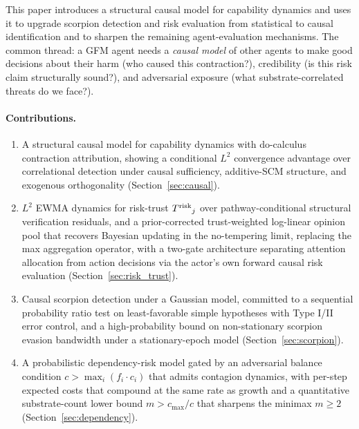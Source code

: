 This paper introduces a structural causal model for capability dynamics
and uses it to upgrade scorpion detection and risk evaluation from
statistical to causal identification and to sharpen the remaining
agent-evaluation mechanisms. The common
thread: a GFM agent needs a \emph{causal model} of other agents to make
good decisions about their harm (who caused this contraction?),
credibility (is this risk claim structurally sound?), and adversarial
exposure (what substrate-correlated threats do we face?).

\paragraph{Contributions.}
\begin{enumerate}
\item A structural causal model for capability dynamics with
  do-calculus contraction attribution, showing a conditional $L^2$
  convergence advantage over correlational detection under causal
  sufficiency, additive-SCM structure, and exogenous orthogonality
  (Section~\ref{sec:causal}).
\item $L^2$ EWMA dynamics for risk-trust ${T^{\mathrm{risk}}}_j$ over
  pathway-conditional structural verification residuals, and a
  prior-corrected trust-weighted log-linear opinion pool that recovers
  Bayesian updating in the no-tempering limit, replacing the max
  aggregation operator, with a two-gate architecture separating
  attention allocation from action decisions via the actor's own
  forward causal risk evaluation (Section~\ref{sec:risk_trust}).
\item Causal scorpion detection under a Gaussian model, committed to a
  sequential probability ratio test on least-favorable simple
  hypotheses with Type I/II error control, and a high-probability
  bound on non-stationary scorpion evasion bandwidth under a
  stationary-epoch model (Section~\ref{sec:scorpion}).
\item A probabilistic dependency-risk model gated by an adversarial
  balance condition $c > \max_i (f_i \cdot c_i)$ that admits contagion
  dynamics, with per-step expected costs that compound at the same
  rate as growth and a quantitative substrate-count lower bound
  $m > c_{\max}/c$ that sharpens the minimax $m \geq 2$
  (Section~\ref{sec:dependency}).
\end{enumerate}
